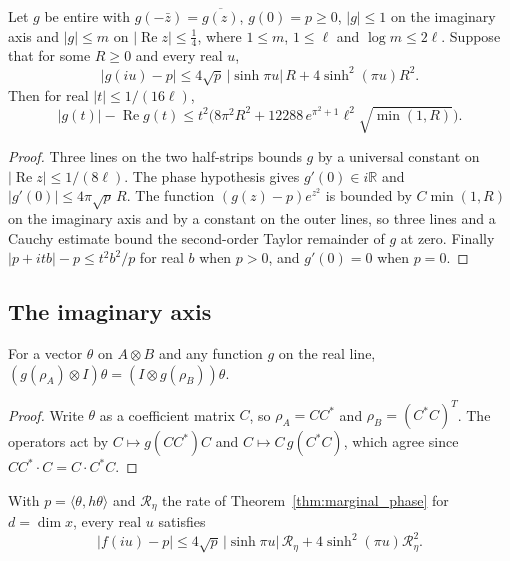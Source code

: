 \begin{theorem}
    \label{thm:skew_departure}
    \leanok
    Let $g$ be entire with $g(-\bar z)=\overline{g(z)}$, $g(0)=p\ge0$,
    $|g|\le1$ on the imaginary axis and $|g|\le m$ on
    $|\operatorname{Re}z|\le\frac14$, where $1\le m$, $1\le\ell$ and
    $\log m\le2\ell$. Suppose that for some $R\ge0$ and every real $u$,
    \[
      |g(iu)-p|\le4\sqrt p\,|\sinh\pi u|\,R+4\sinh^2(\pi u)R^2 .
    \]
    Then for real $|t|\le1/(16\ell)$,
    \[
      |g(t)|-\operatorname{Re}g(t)\le t^2\bigl(8\pi^2R^2
        +12288\,e^{\pi^2+1}\ell^2\sqrt{\min(1,R)}\bigr).
    \]
\end{theorem}

\begin{proof}\leanok
    Three lines on the two half-strips bounds $g$ by a universal constant on
    $|\operatorname{Re}z|\le1/(8\ell)$. The phase hypothesis gives
    $g'(0)\in i\mathbb R$ and $|g'(0)|\le4\pi\sqrt p\,R$. The function
    $(g(z)-p)e^{z^2}$ is bounded by $C\min(1,R)$ on the imaginary axis and by a
    constant on the outer lines, so three lines and a Cauchy estimate bound the
    second-order Taylor remainder of $g$ at zero. Finally
    $|p+itb|-p\le t^2b^2/p$ for real $b$ when $p>0$, and $g'(0)=0$ when $p=0$.
\end{proof}

\subsection{The imaginary axis}

\begin{lemma}
    \label{lem:schmidt_mirroring}
    \leanok
    For a vector $\theta$ on $A\otimes B$ and any function $g$ on the real
    line, $(g(\rho_A)\otimes I)\theta=(I\otimes g(\rho_B))\theta$.
\end{lemma}

\begin{proof}\leanok
    Write $\theta$ as a coefficient matrix $C$, so $\rho_A=CC^*$ and
    $\rho_B=(C^*C)^T$. The operators act by $C\mapsto g(CC^*)C$ and
    $C\mapsto C\,g(C^*C)$, which agree since $CC^*\cdot C=C\cdot C^*C$.
\end{proof}

\begin{lemma}
    \label{lem:skew_imaginary_axis}
    \leanok
    With $p=\langle\theta,h\theta\rangle$ and $\mathcal R_\eta$ the rate of
    Theorem~\ref{thm:marginal_phase} for $d=\dim x$, every real $u$ satisfies
    \[
      |f(iu)-p|\le4\sqrt p\,|\sinh\pi u|\,\mathcal R_\eta
        +4\sinh^2(\pi u)\mathcal R_\eta^2 .
    \]
\end{lemma}

